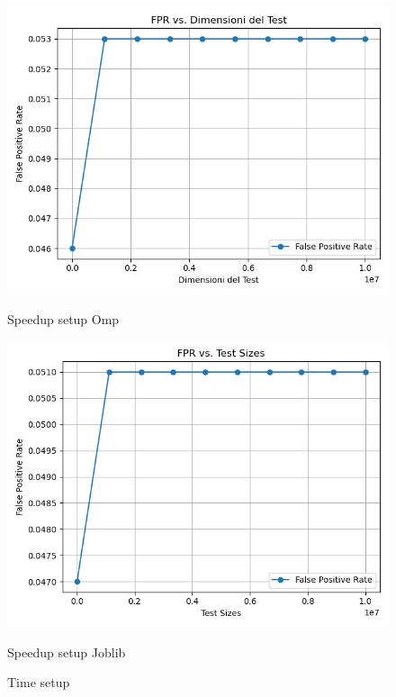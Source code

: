 \documentclass[11pt]{article}
\begin{document}
    \begin{figure}[H]
        \centering
        \includegraphics[width=\linewidth]{omp/005/filter_fpr_plot}
            \caption{Speedup setup Omp}\label{fig:005-filter_fpr_omp}
        \endminipage\hfill
        \includegraphics[width=\linewidth]{joblib/005/filter_fpr_plot}
            \caption{Speedup setup Joblib}\label{fig:005-filter_fpr_joblib}
        \endminipage\hfill
        \caption{Time setup}
    \end{figure}
\end{document}
